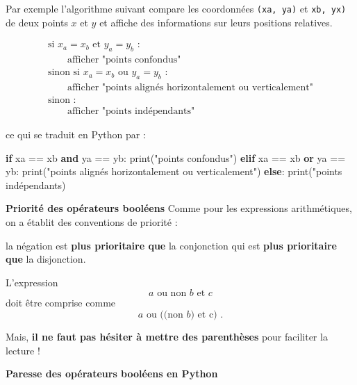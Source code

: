 \documentclass[a4paper,17pt]{extarticle}
\newenvironment{Shaded}{}{}
\newcommand{\KeywordTok}[1]{\textcolor[rgb]{0.00,0.44,0.13}{\textbf{{#1}}}}
\newcommand{\StringTok}[1]{\textcolor[rgb]{0.25,0.44,0.63}{{#1}}}
\newcommand{\NormalTok}[1]{{#1}}
\newcommand{\ControlFlowTok}[1]{\textcolor[rgb]{0.00,0.44,0.13}{\textbf{{#1}}}}
\newcommand{\OperatorTok}[1]{\textcolor[rgb]{0.40,0.40,0.40}{{#1}}}
\newcommand{\BuiltInTok}[1]{{#1}}
\begin{document}
\begin{exemple}
    Par exemple l'algorithme suivant compare les coordonnées
\texttt{(xa,\ ya)} et \texttt{xb,\ yx)} de deux points \(x\) et \(y\) et
affiche des informations sur leurs positions relatives.

\[
\begin{array}{ll}
\text{si $x_a = x_b$ et $y_a = y_b$ :} \\
\qquad\text{afficher "points confondus"} \\
\text{sinon si $x_a = x_b$ ou $y_a = y_b$ :} \\
\qquad \text{afficher "points alignés horizontalement ou verticalement"}\\
\text{sinon :}\\
\qquad\text{afficher "points indépendants"}
\end{array}
\]

ce qui se traduit en Python par :

\begin{Shaded}
\begin{Highlighting}[]
\ControlFlowTok{if}\NormalTok{ xa }\OperatorTok{==}\NormalTok{ xb }\KeywordTok{and}\NormalTok{ ya }\OperatorTok{==}\NormalTok{ yb:}
    \BuiltInTok{print}\NormalTok{(}\StringTok{"points confondus"}\NormalTok{)}
\ControlFlowTok{elif}\NormalTok{ xa }\OperatorTok{==}\NormalTok{ xb }\KeywordTok{or}\NormalTok{ ya }\OperatorTok{==}\NormalTok{ yb:}
    \BuiltInTok{print}\NormalTok{(}\StringTok{"points alignés horizontalement ou verticalement"}\NormalTok{)}
\ControlFlowTok{else}\NormalTok{:}
    \BuiltInTok{print}\NormalTok{(}\StringTok{"points indépendants)}
\end{Highlighting}
\end{Shaded}

        \end{exemple}\begin{remarque}
    \textbf{Priorité des opérateurs booléens} Comme pour les expressions
arithmétiques, on a établit des conventions de priorité :

la négation est \textbf{plus prioritaire que} la conjonction qui est
\textbf{plus prioritaire que} la disjonction.

L'expression \[\text{$a$ ou non $b$ et $c$}\] doit être comprise comme
\[\text{$a$ ou $\big(($non $b$) et c$\big)$ .}\]

Mais, \textbf{il ne faut pas hésiter à mettre des parenthèses} pour
faciliter la lecture !

        \end{remarque}\begin{remarque}
    \textbf{Paresse des opérateurs booléens en Python}


\end{remarque}
\end{document}
